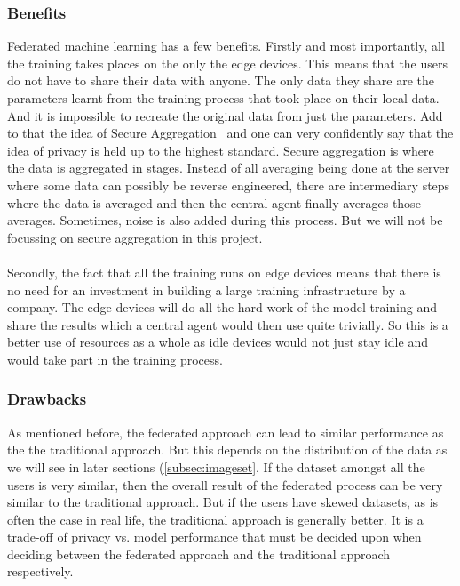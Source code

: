 \documentclass[12pt]{article}
\begin{document}
\subsubsection{Benefits}
Federated machine learning has a few benefits. Firstly and most importantly, all the training takes places on the only the edge devices. This means that the users do not have to share their data with anyone. The only data they share are the parameters learnt from the training process that took place on their local data. And it is impossible to recreate the original data from just the parameters. Add to that the idea of Secure Aggregation~\cite{secagg} and one can very confidently say that the idea of privacy is held up to the highest standard. Secure aggregation is where the data is aggregated in stages. Instead of all averaging being done at the server where some data can possibly be reverse engineered, there are intermediary steps where the data is averaged and then the central agent finally averages those averages. Sometimes, noise is also added during this process. But we will not be focussing on secure aggregation in this project. 
\\\\
Secondly, the fact that all the training runs on edge devices means that there is no need for an investment in building a large training infrastructure by a company. The edge devices will do all the hard work of the model training and share the results which a central agent would then use quite trivially. So this is a better use of resources as a whole as idle devices would not just stay idle and would take part in the training process.
\subsubsection{Drawbacks}
As mentioned before, the federated approach can lead to similar performance as the the traditional approach. But this depends on the distribution of the data as we will see in later sections (\ref{subsec:imageset}. If the dataset amongst all the users is very similar, then the overall result of the federated process can be very similar to the traditional approach. But if the users have skewed datasets, as is often the case in real life, the traditional approach is generally better. It is a trade-off of privacy vs. model performance that must be decided upon when deciding between the federated approach and the traditional approach respectively.
\clearpage
\end{document}
